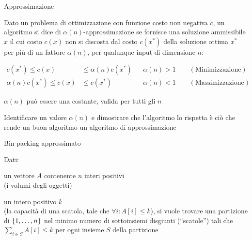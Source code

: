 \begin{frame}{Approssimazione}

\vspace{-9pt}
\begin{myboxtitle}[Definizione]
Dato un problema di ottimizzazione con funzione costo non negativa $c$,
un algoritmo si dice di \alert{$\alpha(n)$-approssimazione} se fornisce una soluzione ammissibile $x$ il cui costo $c(x)$ non si discosta dal costo $c(x^*)$ della soluzione ottima $x^*$ per più di un fattore $\alpha(n)$,
per qualunque input di dimensione $n$:

\begin{align*}
c(x^*) \leq c(x) & \leq \alpha(n) c(x^*)  && \alpha(n) > 1 \qquad (\textrm{Minimizzazione})\\
\alpha(n) c(x^*) \leq c(x) & \leq c(x^*)  && \alpha(n) < 1 \qquad (\textrm{Massimizzazione})
\end{align*}
\end{myboxtitle}

\BIL
\item $\alpha(n)$ può essere una costante, valida per tutti gli $n$
\item Identificare un valore $\alpha(n)$ e dimostrare che l'algoritmo lo rispetta è ciò che rende un buon algoritmo un algoritmo di approssimazione
\EIL


\end{frame}


\begin{frame}{Bin-packing approssimato}

\vspace{-9pt}
\begin{myboxtitle}
Dati:
\BI
\item un vettore $A$ contenente $n$ interi positivi\\
(i \alert{volumi} degli \alert{oggetti}) 
\item un intero positivo $k$\\
(la \alert{capacità} di una \alert{scatola}, tale che $\forall i: A[i] \leq k$), 
\EI
si vuole trovare una partizione di $\{1, \ldots, n\}$ nel minimo numero di sottoinsiemi disgiunti (``scatole'') tali che $\sum_{i\in S} A[i] \le k$ per ogni insieme $S$ della partizione
\end{myboxtitle}


\end{frame}

